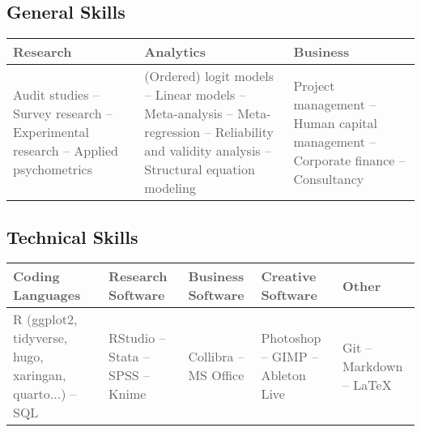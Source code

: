 \documentclass[11pt,a4paper,]{awesome-cv}
\begin{document}
\medskip

\hypertarget{general-skills}{%
\subsection{General Skills}\label{general-skills}}

\begin{table}[H]
\centering\begingroup\fontsize{9}{11}\selectfont

\begin{tabular}{>{\centering\arraybackslash}p{5.2cm}>{\centering\arraybackslash}p{5.2cm}>{\centering\arraybackslash}p{5.2cm}}
\toprule
\textcolor[HTML]{5d5d5d}{\textbf{Research}} & \textcolor[HTML]{5d5d5d}{\textbf{Analytics}} & \textcolor[HTML]{5d5d5d}{\textbf{Business}}\\
\midrule
\textcolor[HTML]{5d5d5d}{Audit studies -- Survey research -- Experimental research -- Applied psychometrics} & \textcolor[HTML]{5d5d5d}{(Ordered) logit models -- Linear models -- Meta-analysis -- Meta-regression -- Reliability and validity analysis -- Structural equation modeling} & \textcolor[HTML]{5d5d5d}{Project management -- Human capital management -- Corporate finance -- Consultancy}\\
\bottomrule
\end{tabular}
\endgroup{}
\end{table}

\hypertarget{technical-skills}{%
\subsection{Technical Skills}\label{technical-skills}}

\begin{table}[H]
\centering\begingroup\fontsize{9}{11}\selectfont

\begin{tabular}{>{\centering\arraybackslash}p{2.96cm}>{\centering\arraybackslash}p{2.96cm}>{\centering\arraybackslash}p{2.96cm}>{\centering\arraybackslash}p{2.96cm}>{\centering\arraybackslash}p{2.96cm}}
\toprule
\textcolor[HTML]{5d5d5d}{\textbf{Coding Languages}} & \textcolor[HTML]{5d5d5d}{\textbf{Research Software}} & \textcolor[HTML]{5d5d5d}{\textbf{Business Software}} & \textcolor[HTML]{5d5d5d}{\textbf{Creative Software}} & \textcolor[HTML]{5d5d5d}{\textbf{Other}}\\
\midrule
\textcolor[HTML]{5d5d5d}{R (ggplot2, tidyverse, hugo, xaringan, quarto...) -- SQL} & \textcolor[HTML]{5d5d5d}{RStudio -- Stata -- SPSS -- Knime} & \textcolor[HTML]{5d5d5d}{Collibra -- MS Office} & \textcolor[HTML]{5d5d5d}{Photoshop -- GIMP -- Ableton Live} & \textcolor[HTML]{5d5d5d}{Git -- Markdown -- LaTeX}\\
\bottomrule
\end{tabular}
\endgroup{}
\end{table}
\end{document}
